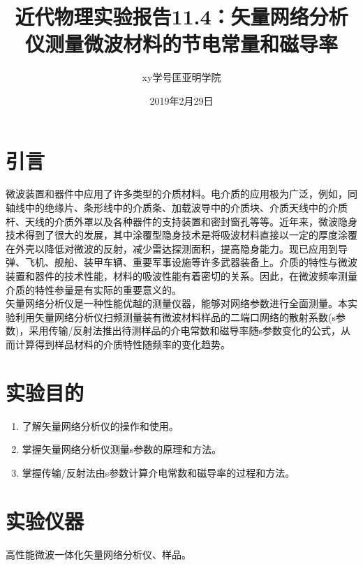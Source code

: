\documentclass[a4paper]{article}
\title{近代物理实验报告11.4：矢量网络分析仪测量微波材料的节电常量和磁导率}
\author{xy\quad 学号\quad 匡亚明学院}
\date{2019年2月29日}
\begin{document}
\maketitle


\section{引言}
微波装置和器件中应用了许多类型的介质材料。电介质的应用极为广泛，例如，同轴线中的绝缘片、条形线中的介质条、加载波导中的介质块、介质天线中的介质杆、天线的介质外罩以及各种器件的支持装置和密封窗孔等等。近年来，微波隐身技术得到了很大的发展，其中涂覆型隐身技术是将吸波材料直接以一定的厚度涂覆在外壳以降低对微波的反射，减少雷达探测面积，提高隐身能力。现已应用到导弹、飞机、舰船、装甲车辆、重要军事设施等许多武器装备上。介质的特性与微波装置和器件的技术性能，材料的吸波性能有着密切的关系。因此，在微波频率测量介质的特性参量是有实际的重要意义的。\\
矢量网络分析仪是一种性能优越的测量仪器，能够对网络参数进行全面测量。本实验利用矢量网络分析仪扫频测量装有微波材料样品的二端口网络的散射系数(s参数)，采用传输/反射法推出待测样品的介电常数和磁导率随s参数变化的公式，从而计算得到样品材料的介质特性随频率的变化趋势。

\section{实验目的}
\begin{enumerate}
\item 了解矢量网络分析仪的操作和使用。
\item 掌握矢量网络分析仪测量s参数的原理和方法。
\item 掌握传输/反射法由s参数计算介电常数和磁导率的过程和方法。
\end{enumerate}

\section{实验仪器}
高性能微波一体化矢量网络分析仪、样品。
\end{document}
